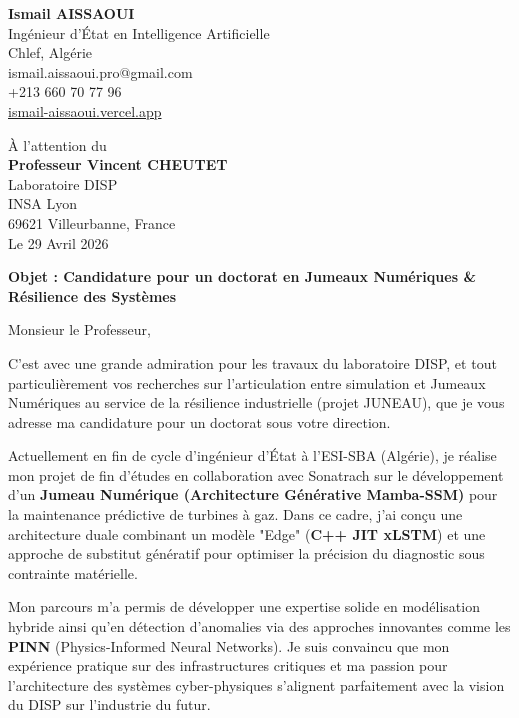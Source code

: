 \documentclass[a4paper,12pt]{article}
\begin{document}
\begin{flushleft}
    \textbf{Ismail AISSAOUI} \\
    Ingénieur d'État en Intelligence Artificielle \\
    Chlef, Algérie \\
    ismail.aissaoui.pro@gmail.com \\
    +213 660 70 77 96 \\
    \href{https://ismail-aissaoui.vercel.app}{ismail-aissaoui.vercel.app}
\end{flushleft}

\begin{flushright}
    À l'attention du \\
    \textbf{Professeur Vincent CHEUTET} \\
    Laboratoire DISP \\
    INSA Lyon \\
    69621 Villeurbanne, France \\
    \medskip
    Le 29 Avril 2026
\end{flushright}

\bigskip

\noindent \textbf{Objet : Candidature pour un doctorat en Jumeaux Numériques \& Résilience des Systèmes}

\bigskip

Monsieur le Professeur,

C'est avec une grande admiration pour les travaux du laboratoire DISP, et tout particulièrement vos recherches sur l'articulation entre simulation et Jumeaux Numériques au service de la résilience industrielle (projet JUNEAU), que je vous adresse ma candidature pour un doctorat sous votre direction.

Actuellement en fin de cycle d'ingénieur d'État à l'ESI-SBA (Algérie), je réalise mon projet de fin d'études en collaboration avec Sonatrach sur le développement d'un \textbf{Jumeau Numérique (Architecture Générative Mamba-SSM)} pour la maintenance prédictive de turbines à gaz. Dans ce cadre, j'ai conçu une architecture duale combinant un modèle "Edge" (\textbf{C++ JIT xLSTM}) et une approche de substitut génératif pour optimiser la précision du diagnostic sous contrainte matérielle.

Mon parcours m'a permis de développer une expertise solide en modélisation hybride ainsi qu'en détection d'anomalies via des approches innovantes comme les \textbf{PINN} (Physics-Informed Neural Networks). Je suis convaincu que mon expérience pratique sur des infrastructures critiques et ma passion pour l'architecture des systèmes cyber-physiques s'alignent parfaitement avec la vision du DISP sur l'industrie du futur.
\end{document}
